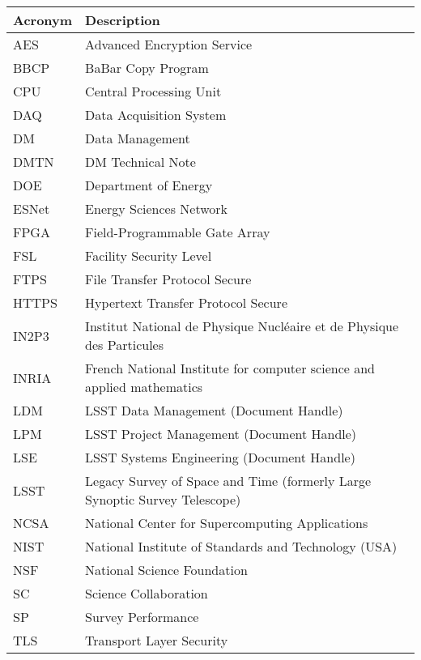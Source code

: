 \addtocounter{table}{-1}
\begin{longtable}{p{}p{}}\hline
\textbf{Acronym} & \textbf{Description}  \\\hline

AES & Advanced Encryption Service \\\hline
BBCP & BaBar Copy Program \\\hline
CPU & Central Processing Unit \\\hline
DAQ & Data Acquisition System \\\hline
DM & Data Management \\\hline
DMTN & DM Technical Note \\\hline
DOE & Department of Energy \\\hline
ESNet & Energy Sciences Network \\\hline
FPGA & Field-Programmable Gate Array \\\hline
FSL & Facility Security Level \\\hline
FTPS & File Transfer Protocol Secure \\\hline
HTTPS & Hypertext Transfer Protocol Secure \\\hline
IN2P3 & Institut National de Physique Nucléaire et de Physique des Particules \\\hline
INRIA & French National Institute for computer science and applied mathematics \\\hline
LDM & LSST Data Management (Document Handle) \\\hline
LPM & LSST Project Management (Document Handle) \\\hline
LSE & LSST Systems Engineering (Document Handle) \\\hline
LSST & Legacy Survey of Space and Time (formerly Large Synoptic Survey Telescope) \\\hline
NCSA & National Center for Supercomputing Applications \\\hline
NIST & National Institute of Standards and Technology (USA) \\\hline
NSF & National Science Foundation \\\hline
SC & Science Collaboration \\\hline
SP & Survey Performance \\\hline
TLS & Transport Layer Security \\\hline
\end{longtable}
